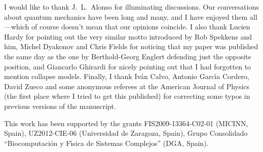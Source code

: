 \documentclass[12pt]{article}
\begin{document}
\hspace{0.5cm} I would like to thank J.~L.~Alonso for illuminating
discussions. Our conversations about quantum mechanics have been long and
many, and I have enjoyed them all ---which of course doesn't mean that our
opinions coincide. I also thank Lucien Hardy for pointing out the very similar
motto introduced by Rob Spekkens and him, Michel Dyakonov and Chris Fields for
noticing that my paper was published the same day as the one by Berthold-Georg
Englert defending just the opposite position, and Giancarlo Ghirardi for
nicely pointing out that I had forgotten to mention collapse models. Finally,
I thank Iv\'an Calvo, Antonio Garc\'{\i}a Cordero, David Zueco and some
anonymous referees at the American Journal of Physics (the first place where I
tried to get this published) for correcting some typos in previous versions of
the manuscript.

This work has been supported by the grants FIS2009-13364-C02-01 (MICINN,
Spain), UZ2012-CIE-06 (Universidad de Zaragoza, Spain), Grupo Consolidado
``Biocomputaci\'on y F\'{\i}sica de Sistemas Complejos'' (DGA, Spain).


%
\end{document}
